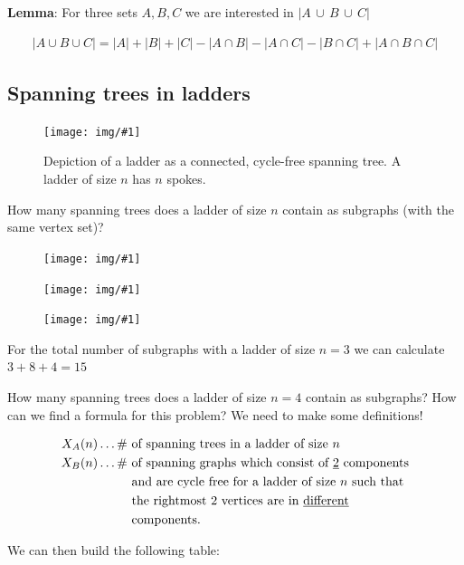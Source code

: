 \documentclass[12pt,onecolumn%
]{scrartcl}
\newcommand{\img}[3]{
\begin{figure}[H]
	\centering
	\texttt{[image: img/\#1]}
	\captionsetup{width=0.8\textwidth, justification=centering}
	\caption{#3}
\end{figure}
}
\newcommand{\imgnc}[2]{
\begin{figure}[H]
	\centering
	\texttt{[image: img/\#1]}
	\captionsetup{width=0.8\textwidth, justification=centering}
\end{figure}
}
\newcommand{\eq}[1]{
\begin{equation*}
\begin{aligned}
#1
\end{aligned}
\end{equation*}
}
\begin{document}
{\bf Lemma}: For three sets $A,B,C$ we are interested in $|A \, \cup \, B \, \cup \, C|$
\eq{|A \cup B \cup C| = |A| + |B| + |C| - |A \cap B| - |A \cap C| - |B \cap C| + |A \cap B \cap C|}


\subsection{Spanning trees in ladders}

\img{ladder_spoke}
    {scale=1, trim=200 420 450 120}
    {Depiction of a ladder as a connected, cycle-free spanning tree. A ladder of size $n$ 		has $n$ spokes.}
    
How many spanning trees does a ladder of size $n$ contain as subgraphs (with the same vertex set)?

\imgnc{ladder_subgraphs}{scale=1, trim=100 425 100 120, clip}

\imgnc{ladder_subgraphs}{scale=1, trim=100 275 100 370, clip}

\imgnc{ladder_subgraphs_n3}{scale=1, trim=100 400 100 125, clip}

For the total number of subgraphs with a ladder of size $n=3$ we can calculate \\ $3+8+4=15$ 

How many spanning trees does a ladder of size $n=4$ contain as subgraphs? How can we find a formula for this problem? We need to make some definitions!

\eq{
	X_A (n) \dots \# &\text{ of spanning trees in a ladder of size } n \\
	X_B (n) \dots \# &\text{ of spanning graphs which consist of \underline{2} components} \\
					 &\text{ and are cycle free for a ladder of size } n \text{ such that} \\
					 &\text{ the rightmost 2 vertices are in \underline{different}} \\
					 &\text{ components.}
}

We can then build the following table:
\end{document}
